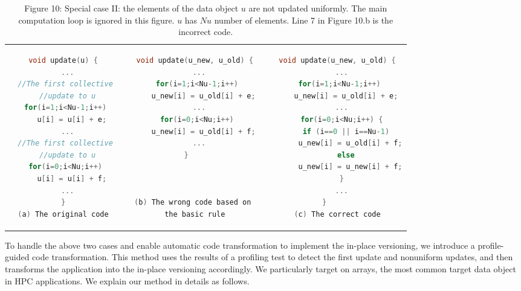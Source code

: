 \begin{comment}
\begin{figure}
\centering
\texttt{[image: figures/inconsistent\_update.pdf]}
\caption{Special case II: nonuniform update. The code on the left is the original code. The code on the right is the dual version with uncertainty. The array $u$ is the data object we want to be consistent on NVM. $u$ has $Nu$ number of elements.}
\label{fig:inconsistent_update}
\end{figure}
\end{comment}
\lstset{style=style1}
\begin{table*}
\centering
\begin{tabular}{c p{1cm} c p{1cm} c}
   \begin{lstlisting}[language=c++]
void update(u) {
  ...
  //The first collective 
  //update to u
  for(i=1;i<Nu-1;i++) 
    u[i] = u[i] + e;
  ...
  //The first collective 
  //update to u
  for(i=0;i<Nu;i++) 
    u[i] = u[i] + f;
  ...
}
(a) The original code

  \end{lstlisting}
&
& \begin{lstlisting}[language=c++]
void update(u_new, u_old) {
  ...
  for(i=1;i<Nu-1;i++) 
    u_new[i] = u_old[i] + e;
  ...
  for(i=0;i<Nu;i++) 
    u_new[i] = u_old[i] + f;
  ...
}    



(b) The wrong code based on 
the basic rule
\end{lstlisting} 
&
& \begin{lstlisting}[language=c++]
void update(u_new, u_old) {
  ...
  for(i=1;i<Nu-1;i++) 
    u_new[i] = u_old[i] + e;
  ...
  for(i=0;i<Nu;i++) {
    if (i==0 || i==Nu-1)
      u_new[i] = u_old[i] + f;
    else
      u_new[i] = u_new[i] + f;
  }
  ...
}      
(c) The correct code
\end{lstlisting}\\
\end{tabular}
\caption*{Figure 10: Special case II: the elements of the data object $u$ are not updated uniformly. The main computation loop is ignored in this figure. $u$ has $Nu$ number of elements. Line 7 in Figure 10.b is the incorrect code.}
\label{table:special_case_II}
\vspace{-20pt}
\end{table*}

To handle the above two cases and enable automatic code transformation to implement the in-place versioning, we introduce a profile-guided code transformation.
This method uses the results of a profiling test to detect the first update and nonuniform updates, and then transforms the application into the in-place versioning accordingly.
We particularly target on arrays, the most common target data object in HPC applications. %
We explain our method in details as follows.

